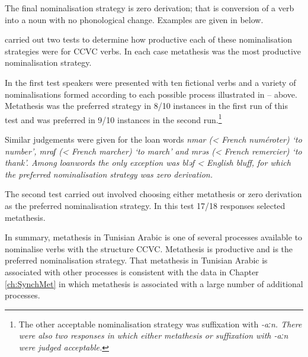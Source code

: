 The final nominalisation strategy is zero derivation;
that is conversion of a verb into a noun with no phonological change.
Examples are given in  below.

\begin{exe}
	\label{ex:TunAraZerDer}
\end{exe}

\citet[71]{kidr86} carried out two tests to determine
how productive each of these nominalisation strategies were for CCVC verbs.
In each case metathesis was the most productive nominalisation strategy.

In the first test speakers were presented with ten fictional verbs
and a variety of nominalisations formed according
to each possible process illustrated in -- above.
Metathesis was the preferred strategy in 8/10 instances
in the first run of this test and was preferred in 9/10 instances in the second run.\footnote{
		The other acceptable nominalisation strategy was suffixation with \it{-aːn}.
		There were also two responses in which either metathesis or suffixation with \it{-aːn}
		were judged acceptable.}

Similar judgements were given for the loan words
\it{nmar} (< French \it{numéroter}) `to number',
\it{mraʃ} (< French \it{marcher}) `to march'
and \it{mrəs} (< French \it{remercier}) `to thank'.
Among loanwords the only exception was \it{bləf} < English \it{bluff},
for which the preferred nominalisation strategy was zero derivation.

The second test \citeauthor{kidr86} carried out
involved choosing either metathesis or zero derivation
as the preferred nominalisation strategy.
In this test 17/18 responses selected metathesis.

In summary, metathesis in Tunisian Arabic is one of several processes
available to nominalise verbs with the structure CCVC.
Metathesis is productive and is the preferred nominalisation strategy.
That metathesis in Tunisian Arabic is associated with other processes
is consistent with the data in Chapter \ref{ch:SynchMet}
in which metathesis is associated with
a large number of additional processes.
